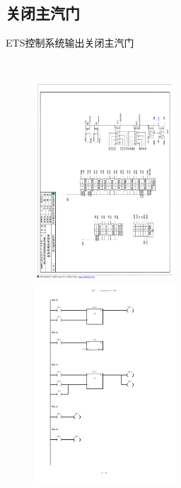 \documentclass[12pt,hyperref={CJKbookmarks=true}]{beamer} %
\begin{document}
\subsection{关闭主汽门}
	\begin{frame}{ETS控制系统输出}{关闭主汽门}
  		\begin{columns}
\begin{figure}
\includegraphics[angle=90,width=150pt,trim=550 200 40 100,clip]{picture/ets8.pdf}\\
\includegraphics[angle=0,width=150pt,trim=0 350 50 100,clip]{picture/plc8.pdf}
	

\end{figure}
\end{columns}
\end{frame}
\end{document}
